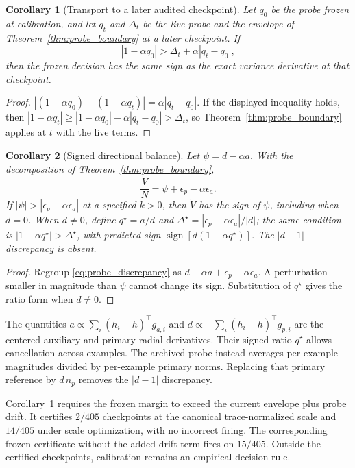\documentclass{article}
\newtheorem{corollary}{Corollary}
\begin{document}
\begin{corollary}[Transport to a later audited checkpoint]\label{cor:transport}
Let $q_0$ be the probe frozen at calibration, and let $q_t$ and $\Delta_t$ be the
live probe and the envelope of Theorem~\ref{thm:probe_boundary} at a later
checkpoint. If
\[
|1-\alpha q_0| > \Delta_t + \alpha|q_t-q_0|,
\]
then the frozen decision has the same sign as the exact variance derivative at
that checkpoint.
\end{corollary}
\begin{proof}
$|(1-\alpha q_0)-(1-\alpha q_t)|=\alpha|q_t-q_0|$. If the displayed inequality
holds, then $|1-\alpha q_t|\ge |1-\alpha q_0|-\alpha|q_t-q_0|>\Delta_t$, so
Theorem~\ref{thm:probe_boundary} applies at $t$ with the live terms.
\end{proof}

\begin{corollary}[Signed directional balance]\label{cor:corrected}
Let $\psi=d-\alpha a$. With the decomposition of Theorem~\ref{thm:probe_boundary},
\[
\frac{\dot V}{N}=\psi+\epsilon_p-\alpha\epsilon_a .
\]
If $|\psi|>|\epsilon_p-\alpha\epsilon_a|$ at a specified $k>0$, then $\dot V$ has the sign of $\psi$, including when $d=0$. When $d\ne0$, define $q^\star=a/d$ and $\Delta^\star=|\epsilon_p-\alpha\epsilon_a|/|d|$; the same condition is $|1-\alpha q^\star|>\Delta^\star$, with predicted sign $\operatorname{sign}[d(1-\alpha q^\star)]$. The $|d-1|$ discrepancy is absent.
\end{corollary}
\begin{proof}
Regroup \eqref{eq:probe_discrepancy} as $d-\alpha a+\epsilon_p-\alpha\epsilon_a$. A perturbation smaller in magnitude than $\psi$ cannot change its sign. Substitution of $q^\star$ gives the ratio form when $d\ne0$.
\end{proof}

The quantities $a\propto\sum_i(h_i-\bar h)^\top g_{a,i}$ and $d\propto-\sum_i(h_i-\bar h)^\top g_{p,i}$ are the centered auxiliary and primary radial derivatives. Their signed ratio $q^\star$ allows cancellation across examples. The archived probe instead averages per-example magnitudes divided by per-example primary norms. Replacing that primary reference by $d\,n_p$ removes the $|d-1|$ discrepancy.

Corollary~\ref{cor:transport} requires the frozen margin to exceed the current envelope plus probe drift. It certifies $2/405$ checkpoints at the canonical trace-normalized scale and $14/405$ under scale optimization, with no incorrect firing. The corresponding frozen certificate without the added drift term fires on $15/405$. Outside the certified checkpoints, calibration remains an empirical decision rule.
\end{document}
